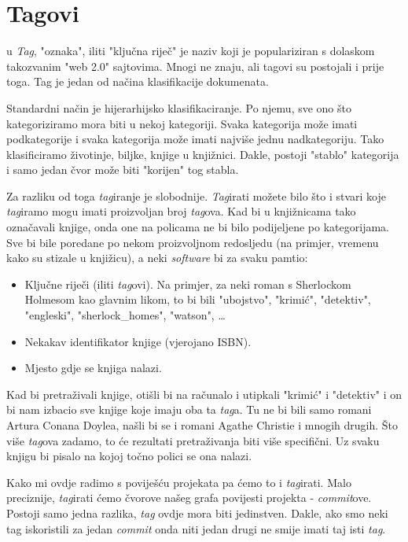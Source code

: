 \chapter*{Tagovi}
u
\emph{Tag}, "oznaka", iliti "ključna riječ" je naziv koji je populariziran s dolaskom takozvanim "web 2.0" sajtovima. 
Mnogi ne znaju, ali tagovi su postojali i prije toga. 
Tag je jedan od načina klasifikacije dokumenata.

Standardni način je hijerarhijsko klasifikaciranje.
Po njemu, sve ono što kategoriziramo mora biti u nekoj kategoriji.
Svaka kategorija može imati podkategorije i svaka kategorija može imati najviše jednu nadkategoriju.
Tako klasificiramo životinje, biljke, knjige u knjižnici.
Dakle, postoji "stablo" kategorija i samo jedan čvor može biti "korijen" tog stabla.

Za razliku od toga \emph{tag}iranje je slobodnije.
\emph{Tag}irati možete bilo što i stvari koje \emph{tag}iramo mogu imati proizvoljan broj \emph{tag}ova.
Kad bi u knjižnicama tako označavali knjige, onda one na policama ne bi bilo podijeljene po kategorijama.
Sve bi bile poredane po nekom proizvoljnom redosljedu (na primjer, vremenu kako su stizale u knjižicu), a neki \emph{software} bi za svaku pamtio:

\begin{itemize}
	\item Ključne riječi (iliti \emph{tag}ovi). Na primjer, za neki roman s Sherlockom Holmesom kao glavnim likom, to bi bili "ubojstvo", "krimić", "detektiv", "engleski", "sherlock\_homes", "watson", \dots
	\item Nekakav identifikator knjige (vjerojano ISBN).
	\item Mjesto gdje se knjiga nalazi.
\end{itemize}

Kad bi pretraživali knjige, otišli bi na računalo i utipkali "krimić" i "detektiv" i on bi nam izbacio sve knjige koje imaju oba ta \emph{tag}a.
Tu ne bi bili samo romani Artura Conana Doylea, našli bi se i romani Agathe Christie i mnogih drugih. 
Što više \emph{tag}ova zadamo, to će rezultati pretraživanja biti više specifični.
Uz svaku knjigu bi pisalo na kojoj točno polici se ona nalazi.

Kako mi ovdje radimo s poviješću projekata pa ćemo to i \emph{tag}irati.
Malo preciznije, \emph{tag}irati ćemo čvorove našeg grafa povijesti projekta - \emph{commit}ove.
Postoji samo jedna razlika, \emph{tag} ovdje mora biti jedinstven.
Dakle, ako smo neki tag iskoristili za jedan \emph{commit} onda niti jedan drugi ne smije imati taj isti \emph{tag}.

